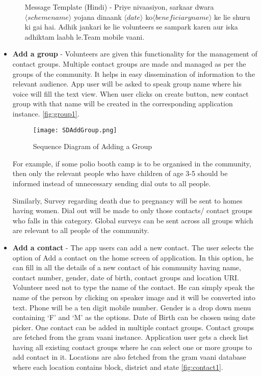 \begin{itemize}
\begin{enumerate}
Message Template (Hindi) - Priye nivaasiyon​, sarkaar dwara $\langle schemename \rangle$ yojana dinaank $\langle date \rangle$ ko ​$\langle beneficiaryname \rangle$ ke lie ​shuru ki gai hai. Adhik jankari ke lie volunteers se sampark karen aur iska adhiktam laabh le.Team mobile vaani.
\end{enumerate}


\item \textbf {Add a group} - Volunteers are given this functionality for the management of contact groups. Multiple contact groups are made and managed as per the groups of the community. It helps in easy dissemination of information to the relevant audience. App user will be asked to speak group name where his voice will fill the text view. When user clicks on create button, new contact group with that name will be created in the corresponding application instance. \ref{fig:group1}.

\begin{figure}[H]
    \centering
	\texttt{[image: SDAddGroup.png]}
    \caption{ Sequence Diagram of Adding a Group}
    \label{fig:Sequence Diagram of Adding a Group}
\end{figure}

For example, if some polio booth camp is to be organised in the community, then only the relevant people who have children of age 3-5 should be informed instead of unnecessary sending dial outs to all people.

Similarly, Survey regarding death due to pregnancy will be sent to homes having women. Dial out will be made to only those contacts/ contact groups who falls in this category. Global surveys can be sent across all groups which are relevant to all people of the community.

 \item \textbf {Add a contact} - The app users can add a new contact. The user selects the option of Add a contact on the  home screen of application. In this option, he can fill in all the details of a new contact of his community having name, contact number, gender, date of birth, contact groups and location URI. Volunteer need not to type the name of the contact. He can simply speak the name of the person by clicking on speaker image and it will be converted into text. Phone will be a ten digit mobile number. Gender is a drop down menu containing ‘F’ and ‘M’ as the options. Date of Birth can be chosen using date picker. One contact can be added in multiple  contact groups. Contact groups are fetched from the gram vaani instance. Application user gets a check list having all existing contact groups where he can select one or more groups to add contact in it. Locations are also fetched from the gram vaani database where each location contains block, district and state \ref{fig:contact1}.
 

\end{itemize}
